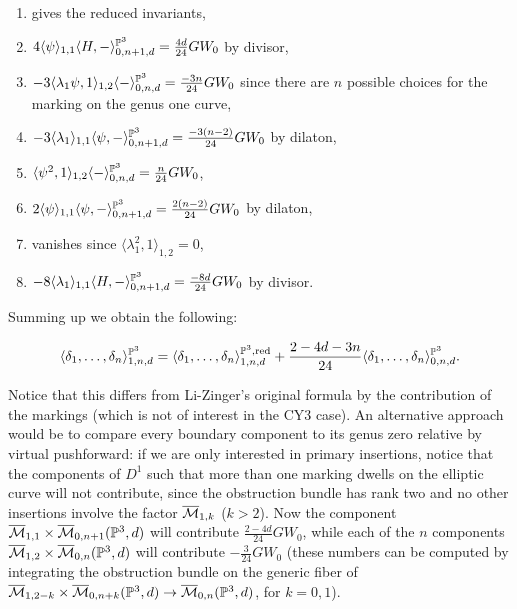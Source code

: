 \begin{enumerate}
 \item gives the reduced invariants,
 \item $4\langle\psi\rangle_{1,1}\langle H,-\rangle^{\mathbb P^3}_{0,n+1,d}=\frac{4d}{24} GW_0$ by divisor,
 \item $-3\langle\lambda_1\psi,1\rangle_{1,2}\langle -\rangle^{\mathbb P^3}_{0,n,d}=\frac{-3n}{24} GW_0$ since there are $n$ possible choices for the marking on the genus one curve,
 \item $-3\langle\lambda_1\rangle_{1,1}\langle \psi,-\rangle^{\mathbb P^3}_{0,n+1,d}=\frac{-3(n-2)}{24} GW_0$ by dilaton,
 \item $\langle\psi^2,1\rangle_{1,2}\langle -\rangle^{\mathbb P^3}_{0,n,d}=\frac{n}{24} GW_0$,
 \item $2\langle\psi\rangle_{1,1}\langle \psi,-\rangle^{\mathbb P^3}_{0,n+1,d}=\frac{2(n-2)}{24} GW_0$ by dilaton,
 \item vanishes since $\langle\lambda_1^2,1\rangle_{1,2}=0$,
 \item $-8\langle\lambda_1\rangle_{1,1}\langle H,-\rangle^{\mathbb P^3}_{0,n+1,d}=\frac{-8d}{24} GW_0$ by divisor.
\end{enumerate}
Summing up we obtain the following:
\begin{prop} \[\langle \delta_1,\ldots,\delta_n \rangle^{\mathbb P^3}_{1,n,d}=\langle \delta_1,\ldots,\delta_n \rangle^{\mathbb P^3,\mathrm{red}}_{1,n,d}+\frac{2-4d-3n}{24}\langle \delta_1,\ldots,\delta_n \rangle^{\mathbb P^3}_{0,n,d}.\] \end{prop}
Notice that this differs from Li-Zinger's original formula by the contribution of the markings (which is not of interest in the CY3 case). An alternative approach would be to compare every boundary component to its genus zero relative by virtual pushforward: if we are only interested in primary insertions, notice that the components of $D^1$ such that more than one marking dwells on the elliptic curve will not contribute, since the obstruction bundle has rank two and no other insertions involve the factor $\overline{\mathcal{M}}_{1,k}$ ($k>2$). Now the component $\overline{\mathcal{M}}_{1,1}\times\overline{\mathcal{M}}_{0,n+1}(\mathbb P^3,d)$ will contribute $\frac{2-4d}{24}GW_0$, while each of the $n$ components $\overline{\mathcal{M}}_{1,2}\times\overline{\mathcal{M}}_{0,n}(\mathbb P^3,d)$ will contribute $-\frac{3}{24}GW_0$ (these numbers can be computed by integrating the obstruction bundle on the generic fiber of $\overline{\mathcal{M}}_{1,2-k}\times\overline{\mathcal{M}}_{0,n+k}(\mathbb P^3,d)\rightarrow\overline{\mathcal{M}}_{0,n}(\mathbb P^3,d)$, for $k=0,1$).

